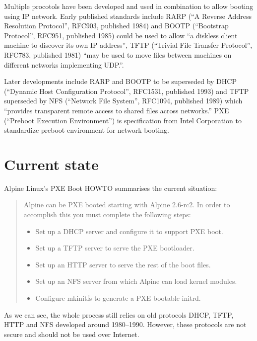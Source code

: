 Multiple procotols have been developed and used in combination to
allow booting using IP network. Early published standards include RARP
(``A Reverse Address Resolution Protocol'', RFC903, published
1984\cite{RFC903}) and BOOTP (``Bootstrap Protocol'', RFC951,
published 1985\cite{RFC951}) could be used to allow ``a diskless
client machine to discover its own IP address''\cite{RFC951}, TFTP
(``Trivial File Transfer Protocol'', RFC783, published
1981\cite{RFC783}) ``may be used to move files between machines on
different networks implementing UDP.''\cite{RFC783}.

Later developments include RARP and BOOTP to be superseded by DHCP
(``Dynamic Host Configuration Protocol'', RFC1531, published
1993\cite{RFC1531}) and TFTP superseded by NFS (``Network File
System'', RFC1094, published 1989\cite{RFC1094}) which ``provides
transparent remote access to shared files across
networks.''\cite{RFC1094} PXE (``Preboot Execution
Environment''\cite{PXEspec}) is specification from Intel Corporation
to standardize preboot environment for network booting.


\section{Current state}

Alpine Linux's PXE Boot HOWTO\cite{alpine-pxe-boot-howto} summarises
the current situation:

\begin{quote}
Alpine can be PXE booted starting with Alpine 2.6-rc2. In order to
accomplish this you must complete the following steps:

\begin{itemize}
\item Set up a DHCP server and configure it to support PXE boot.
\item Set up a TFTP server to serve the PXE bootloader.
\item Set up an HTTP server to serve the rest of the boot files.
\item Set up an NFS server from which Alpine can load kernel modules.
\item Configure mkinitfs to generate a PXE-bootable initrd.
\end{itemize}
\end{quote}

As we can see, the whole process still relies on old protocols DHCP,
TFTP, HTTP and NFS developed around 1980--1990. However, these
protocols are not secure and should not be used over Internet.

